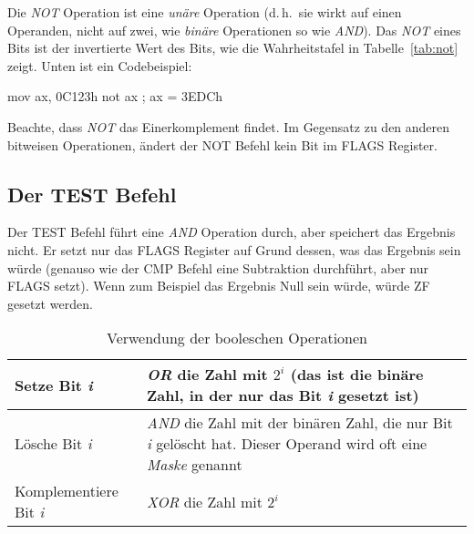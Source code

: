Die \emph{NOT} Operation ist eine \emph{un\"{a}re} Operation
 (d.\,h.\ sie wirkt auf einen Operanden,
nicht auf zwei, wie \emph{bin\"{a}re} Operationen
 so wie \emph{AND}). Das \emph{NOT} eines
Bits ist der invertierte Wert des Bits, wie die Wahrheitstafel in
Tabelle~\ref{tab:not} zeigt. Unten ist ein Codebeispiel:

\begin{AsmCodeListing}[frame=none, numbers=left, firstnumber=last]
      mov    ax, 0C123h
      not    ax               ; ax = 3EDCh
\end{AsmCodeListing}

Beachte, dass \emph{NOT} das Einerkomplement findet. Im Gegensatz zu
den anderen bitweisen Operationen, \"{a}ndert der {\code NOT} Befehl
kein Bit im {\code FLAGS} Register.

\subsection{Der {\code TEST} Befehl}

Der {\code TEST} Befehl f\"{u}hrt eine \emph{AND} Operation durch, aber
speichert das Ergebnis nicht. Er setzt nur das {\code FLAGS}
Register auf Grund dessen, was das Ergebnis sein w\"{u}rde (genauso wie
der {\code CMP} Befehl eine Subtraktion durchf\"{u}hrt, aber nur {\code
FLAGS} setzt). Wenn zum Beispiel das Ergebnis Null sein w\"{u}rde, w\"{u}rde
{\code ZF} gesetzt werden.

\begin{table} %
\centering
\begin{tabular}{|p{}|p{}|}
\hline
 Setze Bit \emph{i}  & \emph{OR} die Zahl mit $2^i$ (das ist die bin\"{a}re
                       Zahl, in der nur das Bit \emph{i} gesetzt ist) \\
\hline
 L\"{o}sche Bit \emph{i} & \emph{AND} die Zahl mit der bin\"{a}ren Zahl, die nur
                       Bit \emph{i} gel\"{o}scht hat. Dieser Operand wird oft
                       eine \emph{Maske} genannt \\
\hline
 Komplementiere Bit \emph{i} & \emph{XOR} die Zahl mit $2^i$ \\
\hline
\end{tabular}
\caption{Verwendung der booleschen Operationen \label{tab:bool}}
\end{table}

